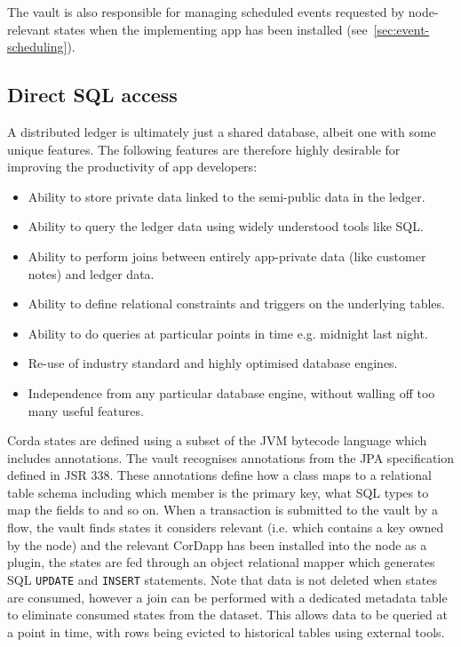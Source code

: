 \documentclass{article}
\begin{document}
The vault is also responsible for managing scheduled events requested by node-relevant states when the implementing
app has been installed (see~\cref{sec:event-scheduling}).

\subsection{Direct SQL access}

A distributed ledger is ultimately just a shared database, albeit one with some unique features. The following
features are therefore highly desirable for improving the productivity of app developers:

\begin{itemize}
\item Ability to store private data linked to the semi-public data in the ledger.
\item Ability to query the ledger data using widely understood tools like SQL.
\item Ability to perform joins between entirely app-private data (like customer notes) and ledger data.
\item Ability to define relational constraints and triggers on the underlying tables.
\item Ability to do queries at particular points in time e.g. midnight last night.
\item Re-use of industry standard and highly optimised database engines.
\item Independence from any particular database engine, without walling off too many useful features.
\end{itemize}

Corda states are defined using a subset of the JVM bytecode language which includes annotations. The vault
recognises annotations from the JPA specification defined in JSR 338\cite{JPA}. These annotations define how a class maps to a relational table schema including which member is the
primary key, what SQL types to map the fields to and so on. When a transaction is submitted to the vault by a flow,
the vault finds states it considers relevant (i.e. which contains a key owned by the node) and the relevant CorDapp
has been installed into the node as a plugin, the states are fed through an object relational mapper which
generates SQL \texttt{UPDATE} and \texttt{INSERT} statements. Note that data is not deleted when states are
consumed, however a join can be performed with a dedicated metadata table to eliminate consumed states from the
dataset. This allows data to be queried at a point in time, with rows being evicted to historical tables using
external tools.
\end{document}
